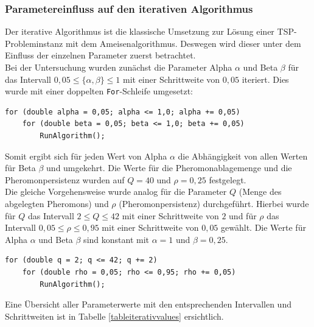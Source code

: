 \documentclass[doktyp=barbeit, sprache=german]{TUBAFarbeiten}
\begin{document}
\subsubsection{Parametereinfluss auf den iterativen Algorithmus}
Der iterative Algorithmus ist die klassische Umsetzung zur Lösung einer TSP-Probleminstanz mit dem Ameisenalgorithmus. Deswegen wird dieser unter dem Einfluss der einzelnen Parameter zuerst betrachtet. \\Bei der Untersuchung wurden zunächst die Parameter Alpha $\alpha$ und Beta $\beta$ für das Intervall $0,05 \leq \{\alpha,\beta\} \leq 1$ mit einer Schrittweite von $0,05$ iteriert. Dies wurde mit einer doppelten \texttt{For}-Schleife umgesetzt:
\begin{lstlisting}
for (double alpha = 0,05; alpha <= 1,0; alpha += 0,05)
	for (double beta = 0,05; beta <= 1,0; beta += 0,05) 
		RunAlgorithm();
\end{lstlisting}
Somit ergibt sich für jeden Wert von Alpha $\alpha$ die Abhängigkeit von allen Werten für Beta $\beta$ und umgekehrt. Die Werte für die Pheromonablagemenge und die Pheromonpersistenz wurden auf $Q = 40$ und $\rho = 0,25$ festgelegt.
\\Die gleiche Vorgehensweise wurde analog für die Parameter $Q$ (Menge des abgelegten Pheromons) und $\rho$ (Pheromonpersistenz) durchgeführt.
Hierbei wurde für $Q$ das Intervall $2 \leq Q \leq 42$ mit einer Schrittweite von $2$ und für $\rho$ das Intervall $0,05 \leq \rho \leq 0,95$ mit einer Schrittweite von $0,05$ gewählt. Die Werte für Alpha $\alpha$ und Beta $\beta$ sind konstant mit $\alpha = 1$ und $\beta = 0,25$. 
\begin{lstlisting}
for (double q = 2; q <= 42; q += 2)
	for (double rho = 0,05; rho <= 0,95; rho += 0,05) 
		RunAlgorithm();
\end{lstlisting}
Eine Übersicht aller Parameterwerte mit den entsprechenden Intervallen und Schrittweiten ist in Tabelle \ref{tableiterativvalues} ersichtlich.
\end{document}
